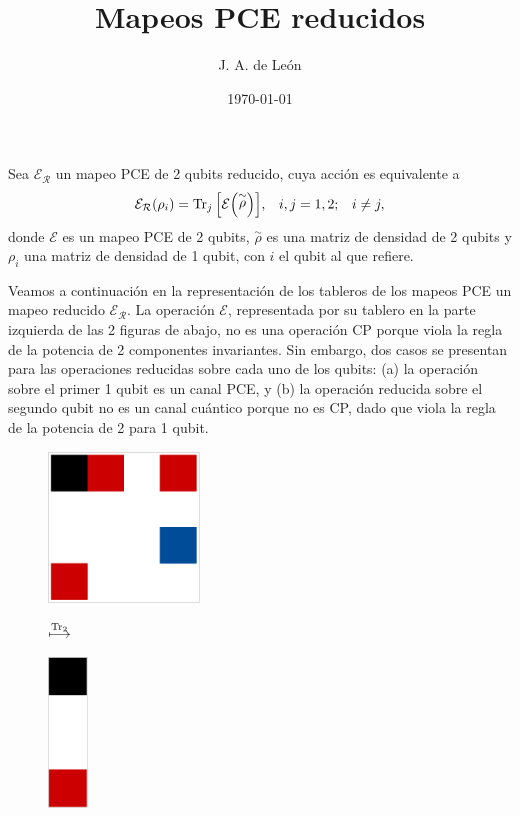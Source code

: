 \documentclass[11pt,dvipsnames]{article} %
\newcommand{\E}{\mathcal{E}}
\newcommand{\1}{\mathds{1}}
\newcommand{\Er}{\E_{\mathcal{R}}}
\begin{document}
\title{Mapeos PCE reducidos} 
\author{J. A. de León}
\date{\today}  
\maketitle

Sea $\E_{\mathcal{R}}$ un mapeo PCE de 2 qubits reducido, 
cuya acción es equivalente a 
\begin{align}
\Er\qty(\rho_i)&=\Tr_j\qty[\E\qty(\stackrel{\sim}{\rho})], 
& i,j&=1,2; & i\neq j,
\label{•}
\end{align}
donde $\E$ es un mapeo PCE de 2 qubits, $\stackrel{\sim}{\rho}$ es
una matriz de densidad de 2 qubits y $\rho_i$ una matriz de densidad
de 1 qubit, con $i$ el qubit al que refiere.


Veamos a continuación en la representación de los tableros de 
los mapeos PCE un mapeo reducido $\Er$. La operación $\E$, 
representada por su tablero en la parte izquierda de las 2 figuras de 
abajo, no es una operación CP porque viola la regla de la potencia de 2 
componentes invariantes. Sin embargo, dos casos se presentan 
para las operaciones reducidas sobre cada uno de los qubits: (a) 
la operación sobre el primer 1 qubit es un canal PCE, y (b) la operación
reducida sobre el segundo qubit no es un canal cuántico porque 
no es CP, dado que viola la regla de la potencia de 2 para 1 qubit.
\begin{figure}[H]
    \centering
    \begin{minipage}{.4\textwidth}
        \centering
        \includegraphics[height=4cm]{img/rndm-tab-2q-1}
    \end{minipage}
    $\stackrel{\Tr _2}{\longmapsto}$
    \begin{minipage}{0.4\textwidth}
        \centering
         \includegraphics[height=4cm]{img/rndm-tab-1q1-1}
         \hfill
    \end{minipage}
\end{figure}
\end{document}
